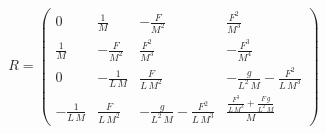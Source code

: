 \begin{equation}
R = \left(\begin{array}{cccc} 0 & \frac{1}{M} & -\frac{F}{M^2} & \frac{F^2}{M^3}\\ \frac{1}{M} & -\frac{F}{M^2} & \frac{F^2}{M^3} & -\frac{F^3}{M^4}\\ 0 & -\frac{1}{L\,M} & \frac{F}{L\,M^2} & -\frac{g}{L^2\,M}-\frac{F^2}{L\,M^3}\\ -\frac{1}{L\,M} & \frac{F}{L\,M^2} & -\frac{g}{L^2\,M}-\frac{F^2}{L\,M^3} & \frac{\frac{F^3}{L\,M^3}+\frac{F\,g}{L^2\,M}}{M} \end{array}\right)
\end{equation}
